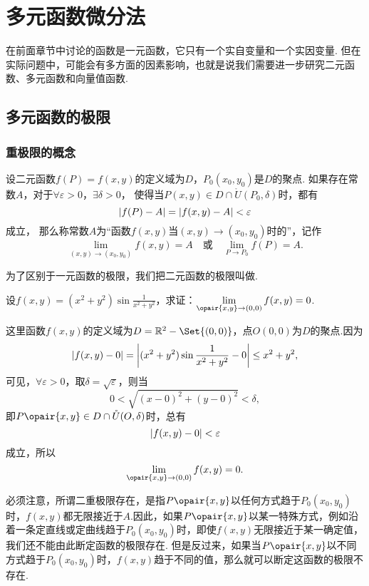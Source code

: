 \chapter{多元函数微分法}
在前面章节中讨论的函数是一元函数，它只有一个实自变量和一个实因变量.
但在实际问题中，可能会有多方面的因素影响，也就是说我们需要进一步研究二元函数、多元函数和向量值函数.

\section{多元函数的极限}
\subsection{重极限的概念}
\begin{definition}
设二元函数\(f(P)=f(x,y)\)的定义域为\(D\)，\(P_0(x_0,y_0)\)是\(D\)的聚点.
如果存在常数\(A\)，对于\(\forall \varepsilon > 0\)，\(\exists \delta > 0\)，
使得当\(P(x,y) \in D \cap \mathring{U}(P_0,\delta)\)时，都有\[
	\abs{f(P)-A} = \abs{f(x,y)-A} < \varepsilon
\]成立，
那么称常数\(A\)为“函数\(f(x,y)\)当\((x,y)\to(x_0,y_0)\)时的”，记作\[
	\lim\limits_{(x,y)\to(x_0,y_0)} f(x,y) = A
	\quad\text{或}\quad
	\lim\limits_{P \to P_0} f(P) = A.
\]

为了区别于一元函数的极限，我们把二元函数的极限叫做.
\end{definition}

\begin{example}
设\(f(x,y) = (x^2+y^2) \sin\frac{1}{x^2+y^2}\)，求证：\(\lim\limits_{\opair{x,y}\to(0,0)} f(x,y) = 0\).
\begin{solution}
这里函数\(f(x,y)\)的定义域为\(D = \mathbb{R}^2 - \Set{(0,0)}\)，点\(O(0,0)\)为\(D\)的聚点.因为\[
\abs{f(x,y)-0}
= \abs{(x^2+y^2) \sin\frac{1}{x^2+y^2} - 0}
\leq x^2+y^2,
\]可见，\(\forall\varepsilon>0\)，取\(\delta=\sqrt{\varepsilon}\)，则当\[
0 < \sqrt{(x-0)^2+(y-0)^2} < \delta,
\]即\(P\opair{x,y} \in D \cap \mathring{U}(O,\delta)\)时，总有\[
\abs{f(x,y)-0} < \varepsilon
\]成立，所以\[
\lim\limits_{\opair{x,y}\to(0,0)} f(x,y) = 0.
\]
\end{solution}
\end{example}

必须注意，所谓二重极限存在，是指\(P\opair{x,y}\)以任何方式趋于\(P_0(x_0,y_0)\)时，\(f(x,y)\)都无限接近于\(A\).因此，如果\(P\opair{x,y}\)以某一特殊方式，例如沿着一条定直线或定曲线趋于\(P_0(x_0,y_0)\)时，即使\(f(x,y)\)无限接近于某一确定值，我们还不能由此断定函数的极限存在.
但是反过来，如果当\(P\opair{x,y}\)以不同方式趋于\(P_0(x_0,y_0)\)时，\(f(x,y)\)趋于不同的值，那么就可以断定这函数的极限不存在.


